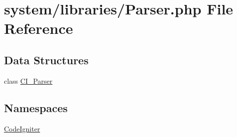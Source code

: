 \hypertarget{_parser_8php}{}\section{system/libraries/\+Parser.php File Reference}
\label{_parser_8php}
\subsection*{Data Structures}
\begin{DoxyCompactItemize}
\item 
class \mbox{\hyperlink{class_c_i___parser}{C\+I\+\_\+\+Parser}}
\end{DoxyCompactItemize}
\subsection*{Namespaces}
\begin{DoxyCompactItemize}
\item 
 \mbox{\hyperlink{namespace_code_igniter}{Code\+Igniter}}
\end{DoxyCompactItemize}

